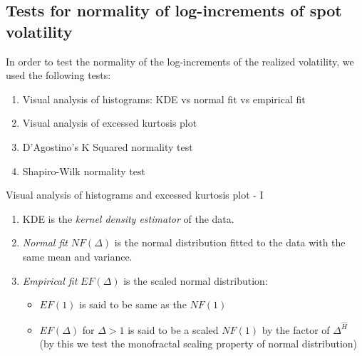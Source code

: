         \subsection{Tests for normality of log-increments of spot volatility}
            \begin{frame}{}
                In order to test the normality of the log-increments of the realized volatility, we used the following tests:
                \begin{enumerate}
                    \item Visual analysis of histograms: KDE vs normal fit vs empirical fit
                    \item Visual analysis of excessed kurtosis plot
                    \item D'Agostino's K Squared normality test
                    \item Shapiro-Wilk normality test
                \end{enumerate}
            \end{frame}

            \begin{frame}{Visual analysis of histograms and excessed kurtosis plot - I}
                \begin{enumerate}
                    \item KDE is the \emph{kernel density estimator} of the data.
                    \item \emph{Normal fit} $NF(\Delta)$ is the normal distribution fitted to the data with the same mean and variance.
                    \item \emph{Empirical fit} $EF(\Delta)$ is the scaled normal distribution:
                        \begin{itemize}
                            \item $EF(1)$ is said to be same as the $NF(1)$
                            \item $EF(\Delta)$ for $\Delta > 1$ is said to be a scaled $NF(1)$ by the 
                                factor of $\Delta^{\hat{H}}$ (by this we test the monofractal scaling 
                                property of normal distribution)
                        \end{itemize}
                \end{enumerate}
            \end{frame}


